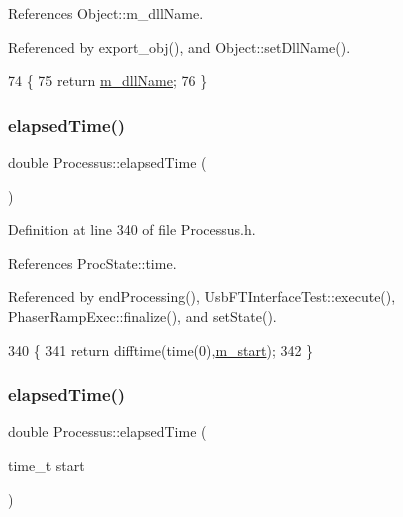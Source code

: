 References Object\+::m\+\_\+dll\+Name.



Referenced by export\+\_\+obj(), and Object\+::set\+Dll\+Name().


\begin{DoxyCode}
74                        \{
75     \textcolor{keywordflow}{return} \hyperlink{classObject_a01afbeacebb8db6831559972ec362eb3}{m\_dllName};
76   \}  
\end{DoxyCode}
\mbox{\label{classProcessus_aecca96218c65bc805c988cd95447df55}} 
\subsubsection{\texorpdfstring{elapsed\+Time()}{elapsedTime()}\hspace{0.1cm}{\footnotesize\ttfamily [1/2]}}
{\footnotesize\ttfamily double Processus\+::elapsed\+Time (\begin{DoxyParamCaption}{ }\end{DoxyParamCaption})\hspace{0.3cm}{\ttfamily [inline]}}



Definition at line 340 of file Processus.\+h.



References Proc\+State\+::time.



Referenced by end\+Processing(), Usb\+F\+T\+Interface\+Test\+::execute(), Phaser\+Ramp\+Exec\+::finalize(), and set\+State().


\begin{DoxyCode}
340                        \{
341     \textcolor{keywordflow}{return} difftime(time(0),\hyperlink{classProcessus_a8ec00b2e12c5beada932610f30218e93}{m\_start});
342   \}
\end{DoxyCode}
\mbox{\label{classProcessus_a06d3815ad56593dfd0d3c1f534f8b146}} 
\subsubsection{\texorpdfstring{elapsed\+Time()}{elapsedTime()}\hspace{0.1cm}{\footnotesize\ttfamily [2/2]}}
{\footnotesize\ttfamily double Processus\+::elapsed\+Time (\begin{DoxyParamCaption}\item[{time\+\_\+t}]{start }\end{DoxyParamCaption})\hspace{0.3cm}{\ttfamily [inline]}}



